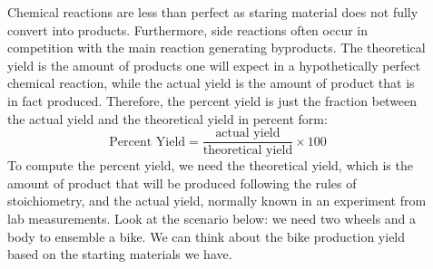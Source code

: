 \documentclass[main.tex]{subfiles}
\begin{document}
\begin{description}
\item[] 
Chemical reactions are less than perfect as staring material does not fully convert into products. Furthermore, side reactions often occur in competition with the main reaction generating byproducts. The theoretical yield is the amount of products one will expect in a hypothetically perfect chemical reaction, while the actual yield is the amount of product that is in fact produced. Therefore, the percent yield is just the fraction between the actual yield and the theoretical yield in percent form:
\begin{equation*}
 \text{Percent Yield}=\dfrac{\text{actual yield}}{\text{theoretical yield}}\times 100
\end{equation*}
To compute the percent yield, we need the theoretical yield, which is the amount of product that will be produced following the rules of stoichiometry, and the actual yield, normally known in an experiment from lab measurements.
Look at the scenario below: we need two wheels and a body to ensemble a bike. We can think about the bike production yield based on the starting materials we have. \begin{center}\vspace{1cm}\hspace{-0.5cm}\end{center}

\end{description}
\end{document}
